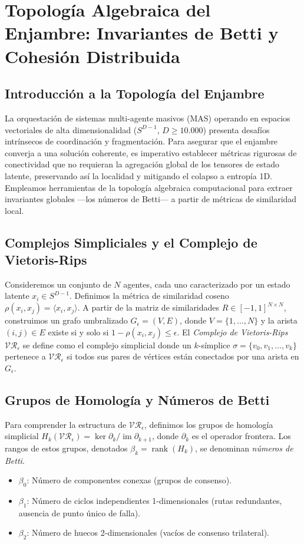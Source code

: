 \chapter{Topología Algebraica del Enjambre: Invariantes de Betti y Cohesión Distribuida}

\section{Introducción a la Topología del Enjambre}
La orquestación de sistemas multi-agente masivos (MAS) operando en espacios vectoriales de alta dimensionalidad ($S^{D-1}$, $D \ge 10.000$) presenta desafíos intrínsecos de coordinación y fragmentación. Para asegurar que el enjambre converja a una solución coherente, es imperativo establecer métricas rigurosas de conectividad que no requieran la agregación global de los tensores de estado latente, preservando así la localidad y mitigando el colapso a entropía 1D. Empleamos herramientas de la topología algebraica computacional para extraer invariantes globales —los números de Betti— a partir de métricas de similaridad local.

\section{Complejos Simpliciales y el Complejo de Vietoris-Rips}
Consideremos un conjunto de $N$ agentes, cada uno caracterizado por un estado latente $x_i \in S^{D-1}$. Definimos la métrica de similaridad coseno $\rho(x_i, x_j) = \langle x_i, x_j \rangle$. A partir de la matriz de similaridades $R \in [-1, 1]^{N \times N}$, construimos un grafo umbralizado $G_\epsilon = (V, E)$, donde $V = \{1, \dots, N\}$ y la arista $(i, j) \in E$ existe si y solo si $1 - \rho(x_i, x_j) \le \epsilon$.
El \emph{Complejo de Vietoris-Rips} $\mathcal{VR}_\epsilon$ se define como el complejo simplicial donde un $k$-símplice $\sigma = \{v_0, v_1, \dots, v_k\}$ pertenece a $\mathcal{VR}_\epsilon$ si todos sus pares de vértices están conectados por una arista en $G_\epsilon$.

\section{Grupos de Homología y Números de Betti}
Para comprender la estructura de $\mathcal{VR}_\epsilon$, definimos los grupos de homología simplicial $H_k(\mathcal{VR}_\epsilon) = \ker \partial_k / \operatorname{im} \partial_{k+1}$, donde $\partial_k$ es el operador frontera.
Los rangos de estos grupos, denotados $\beta_k = \operatorname{rank}(H_k)$, se denominan \emph{números de Betti}.
\begin{itemize}
    \item $\beta_0$: Número de componentes conexas (grupos de consenso).
    \item $\beta_1$: Número de ciclos independientes 1-dimensionales (rutas redundantes, ausencia de punto único de falla).
    \item $\beta_2$: Número de huecos 2-dimensionales (vacíos de consenso trilateral).
\end{itemize}


